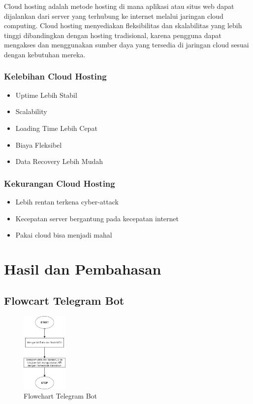 \documentclass[conference]{IEEEtran}
\begin{document}
    Cloud hosting adalah metode hosting di mana aplikasi atau situs web dapat dijalankan dari server yang terhubung ke internet melalui jaringan cloud computing. Cloud hosting menyediakan fleksibilitas dan skalabilitas yang lebih tinggi dibandingkan dengan hosting tradisional, karena pengguna dapat mengakses dan menggunakan sumber daya yang tersedia di jaringan cloud sesuai dengan kebutuhan mereka.
    \vspace{0.2cm}
    \subsubsection{Kelebihan Cloud Hosting}
     
    \begin{itemize}
        \item Uptime Lebih Stabil
        \item Scalability
        \item Loading Time Lebih Cepat
        \item Biaya Fleksibel
        \item Data Recovery Lebih Mudah
      \end{itemize}
      \vspace{0.2cm}
      \subsubsection{Kekurangan Cloud Hosting}
      \begin{itemize}
        \item Lebih rentan terkena cyber-attack
        \item Kecepatan server bergantung pada kecepatan internet
        \item Pakai cloud bisa menjadi mahal
      \end{itemize}
    
    

\section{Hasil dan Pembahasan}
\subsection{Flowcart Telegram Bot}
\begin{figure}[h]
    \centering
    \includegraphics[width=0.2\textwidth]{Flowchart telegram bot.png}
    \caption{Flowchart Telegram Bot}
\end{figure}
\vspace{3cm}
\end{document}
